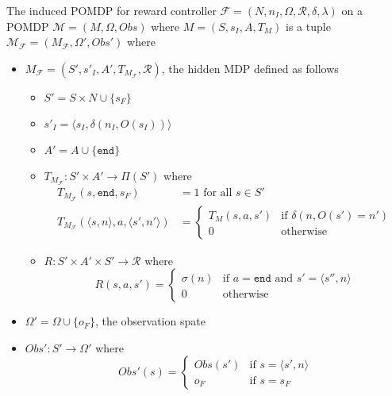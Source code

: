 
\begin{definition}
	\label{def:reward-mdp}
	The induced POMDP for reward controller $\mathcal{F}=(N, n_I, \Omega, \mathcal{R}, \delta, \lambda)$ on a POMDP $\mathcal{M}=(M,\Omega,Obs)$ where $M=(S,s_I,A,T_{M})$ is a tuple $\mathcal{M_\mathcal{F}}=(M_\mathcal{F},\Omega',Obs')$ where 
	\begin{itemize}
		\item $M_\mathcal{F} = (S',s'_I,A',T_{M_\mathcal{F}},\mathcal{R})$, the hidden MDP defined as follows
		\begin{itemize}
			\item $S'=S\times N \cup \{s_F\}$
			\item $s'_I = \langle s_I, \delta(n_I, O(s_I))\rangle$
			\item $A'=A\cup \{\texttt{end}\}$
			\item $T_{M_\mathcal{F}}:S'\times A' \to \Pi(S')$ where
				\begin{align*}				
					T_{M_\mathcal{F}}(s,\texttt{end},s_F) &= 1 \text{ for all } s\in S'\\
					T_{M_\mathcal{F}}(\langle s,n\rangle,a,\langle s',n'\rangle) &= \begin{cases}
						T_M(s,a,s') & \text{if } \delta(n,O(s')=n') \\
						0 & \text{otherwise}
					\end{cases}
				\end{align*}
			\item $R:S'\times A'\times S' \to \mathcal{R}$ where 
                \begin{equation*}
					R(s,a,s') = \begin{cases}
					\sigma(n) & \text{if } a=\texttt{end} \text{ and } s'=\langle s'',n\rangle \\
					0 & \text{otherwise} 
					\end{cases}
				\end{equation*}
		\end{itemize}
		\item $\Omega'=\Omega \cup \{o_F\}$, the observation spate
		\item $Obs':S'\to \Omega'$ where 
			\begin{equation*}
				Obs'(s)= \begin{cases}
				Obs(s') & \text{if } s=\langle s',n\rangle\\
				o_F & \text{if } s=s_F
				\end{cases}
			\end{equation*}
		\end{itemize}
\end{definition}


